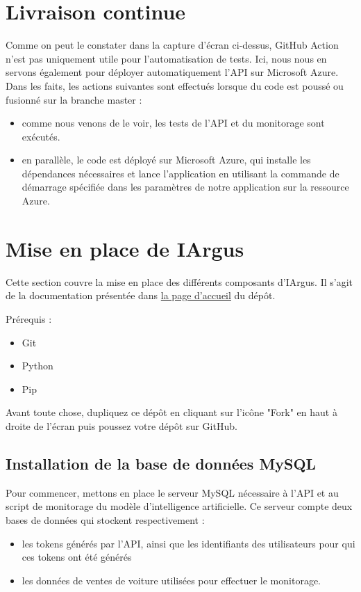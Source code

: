 \documentclass[french]{article}
\begin{document}
    \section{Livraison continue}
    
    Comme on peut le constater dans la capture d'écran ci-dessus, GitHub Action n'est pas uniquement utile pour l'automatisation de tests. Ici, nous nous en servons également pour déployer automatiquement l'API sur Microsoft Azure. Dans les faits, les actions suivantes sont effectués lorsque du code est poussé ou fusionné sur la branche master :
    \begin{itemize}
        \item comme nous venons de le voir, les tests de l'API et du monitorage sont exécutés.
        \item en parallèle, le code est déployé sur Microsoft Azure, qui installe les dépendances nécessaires et lance l'application en utilisant la commande de démarrage spécifiée dans les paramètres de notre application sur la ressource Azure.
    \end{itemize}
    

    \section{Mise en place de IArgus} \label{mise_en_place}

    Cette section couvre la mise en place des différents composants d'IArgus. Il s'agit de la documentation présentée dans \href{https://github.com/vinpap/iargus}{la page d'accueil} du dépôt.

    Prérequis :
    \begin{itemize}
        \item Git
        \item Python 
        \item Pip
    \end{itemize}

    Avant toute chose, dupliquez ce dépôt en cliquant sur l'icône "Fork" en haut à droite de l'écran puis poussez votre dépôt sur GitHub.

    \subsection{Installation de la base de données MySQL}

    Pour commencer, mettons en place le serveur MySQL nécessaire à l'API et au script de monitorage du modèle d'intelligence artificielle. Ce serveur compte deux bases de données qui stockent respectivement :
    \begin{itemize}
        \item les tokens générés par l'API, ainsi que les identifiants des utilisateurs pour qui ces tokens ont été générés
        \item les données de ventes de voiture utilisées pour effectuer le monitorage.
    \end{itemize}
\end{document}

